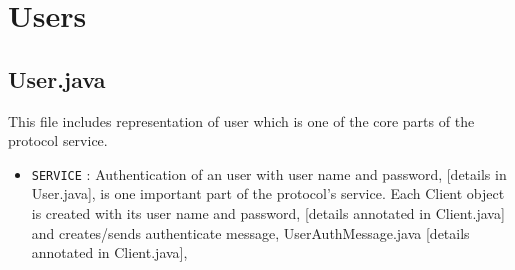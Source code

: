 \documentclass[12pt]{usenixsubmit}
\begin{document}
  \section{Users}
  \subsection{User.java} This file includes representation of user which is one of the core parts of the protocol service. 
  \begin{itemize}
  \item {\tt SERVICE} : Authentication of an user with user name and password, [details in User.java],  is one important part of the protocol's service. Each Client object is created with its user name and password, [details annotated in Client.java] and creates/sends authenticate message, UserAuthMessage.java [details annotated in Client.java], 
    \end{itemize}
\end{document}
